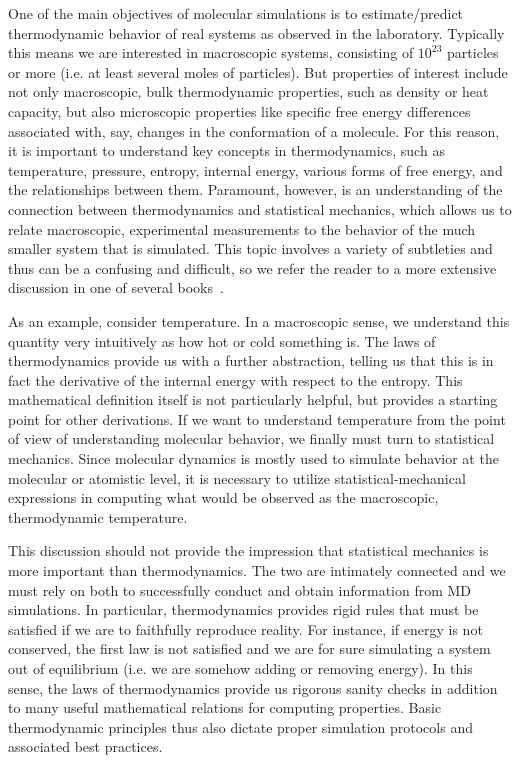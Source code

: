 \documentclass[9pt,bestpractices]{livecoms}
\begin{document}
One of the main objectives of molecular simulations is to estimate/predict thermodynamic behavior of real systems as observed in the laboratory.
Typically this means we are interested in macroscopic systems, consisting of $10^23$ particles or more (i.e. at least several moles of particles). 
But properties of interest include not only macroscopic, bulk thermodynamic properties, such as density or heat capacity,
but also microscopic properties like specific free energy differences associated with, say, changes in the conformation of a molecule.
For this reason, it is important to understand key concepts in thermodynamics, such as temperature, pressure, entropy, internal energy, various forms of free energy, and the relationships between them.
Paramount, however, is an understanding of the connection between thermodynamics and statistical mechanics, which allows us to relate macroscopic, experimental measurements to the behavior of the much smaller system that is simulated.
This topic involves a variety of subtleties and thus can be a confusing and difficult, so we refer the reader to a more extensive discussion in one of several books~\cite{ShellBook, DillBook}.

As an example, consider temperature.
In a macroscopic sense, we understand this quantity very intuitively as how hot or cold something is.
The laws of thermodynamics provide us with a further abstraction, telling us that this is in fact the derivative of the internal energy with respect to the entropy.
This mathematical definition itself is not particularly helpful, but provides a starting point for other derivations.
If we want to understand temperature from the point of view of understanding molecular behavior, we finally must turn to statistical mechanics.
Since molecular dynamics is mostly used to simulate behavior at the molecular or atomistic level, it is necessary to utilize statistical-mechanical expressions in computing what would be observed as the macroscopic, thermodynamic temperature.

This discussion should not provide the impression that statistical mechanics is more important than thermodynamics.
The two are intimately connected and we must rely on both to successfully conduct and obtain information from MD simulations.
In particular, thermodynamics provides rigid rules that must be satisfied if we are to faithfully reproduce reality.
For instance, if energy is not conserved, the first law is not satisfied and we are for sure simulating a system out of equilibrium (i.e. we are somehow adding or removing energy).
In this sense, the laws of thermodynamics provide us rigorous sanity checks in addition to many useful mathematical relations for computing properties.
Basic thermodynamic principles thus also dictate proper simulation protocols and associated best practices.
\end{document}
